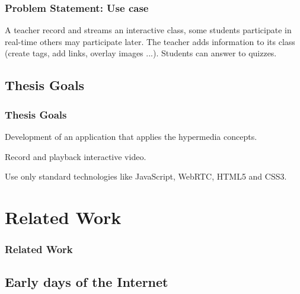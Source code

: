 \documentclass[compress]{beamer}
\begin{document}
  		\begin{frame}[c]
		\frametitle{Problem Statement: Use case}
		A teacher record and streams an interactive class, some students participate in real-time others may participate later.
		\vfill
		The teacher adds information to its class (create tags, add links, overlay images ...).
		\vfill
		Students can answer to quizzes.
		\end{frame}



		
	

	\subsection{Thesis Goals} %
  		\begin{frame}[c]
		\frametitle{Thesis Goals}
		Development of an application that applies the hypermedia concepts.

		\vfill
		
		Record and playback interactive video.
		
		\vfill

		Use only standard technologies like JavaScript, WebRTC, HTML5 and CSS3.

		\end{frame}


\section{Related Work}\label{related}

\begin{frame}[t,shrink]
\frametitle{Related Work} 

\end{frame}

	\subsection{Early days of the Internet}\label{early}
\end{document}
